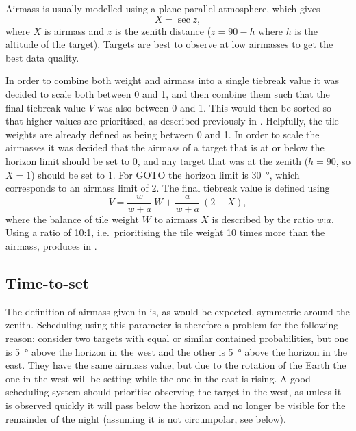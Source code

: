 \begin{colsection}
\begin{colsection}
Airmass is usually modelled using a plane-parallel atmosphere, which gives
%
\begin{equation}
    X = \sec{z},
    \label{eq:airmass}
\end{equation}
%
where $X$ is airmass and $z$ is the zenith distance ($z=90-h$ where $h$ is the altitude of the target). Targets are best to observe at low airmasses to get the best data quality.

In order to combine both weight and airmass into a single tiebreak value it was decided to scale both between 0 and 1, and then combine them such that the final tiebreak value $V$ was also between 0 and 1. This would then be sorted so that higher values are prioritised, as described previously in . Helpfully, the tile weights are already defined as being between 0 and 1. In order to scale the airmasses it was decided that the airmass of a target that is at or below the horizon limit should be set to 0, and any target that was at the zenith ($h=90$, so $X=1$) should be set to 1. For GOTO the horizon limit is \SI{30}{\degree}, which corresponds to an airmass limit of 2. The final tiebreak value is defined using
%
\begin{equation}
    V = \frac{w}{w+a}~W + \frac{a}{w+a}~(2-X),
    \label{eq:wa_ratio}
\end{equation}
%
where the balance of tile weight $W$ to airmass $X$ is described by the ratio $w$:$a$. Using a ratio of 10:1, i.e.\ prioritising the tile weight 10 times more than the airmass, produces  in .

\end{colsection}

\newpage
\subsection{Time-to-set}
\label{sec:tts}
\begin{colsection}

The definition of airmass given in  is, as would be expected, symmetric around the zenith. Scheduling using this parameter is therefore a problem for the following reason: consider two targets with equal or similar contained probabilities, but one is \SI{5}{\degree} above the horizon in the west and the other is \SI{5}{\degree} above the horizon in the east. They have the same airmass value, but due to the rotation of the Earth the one in the west will be setting while the one in the east is rising. A good scheduling system should prioritise observing the target in the west, as unless it is observed quickly it will pass below the horizon and no longer be visible for the remainder of the night (assuming it is not circumpolar, see below).


\end{colsection}
\end{colsection}
